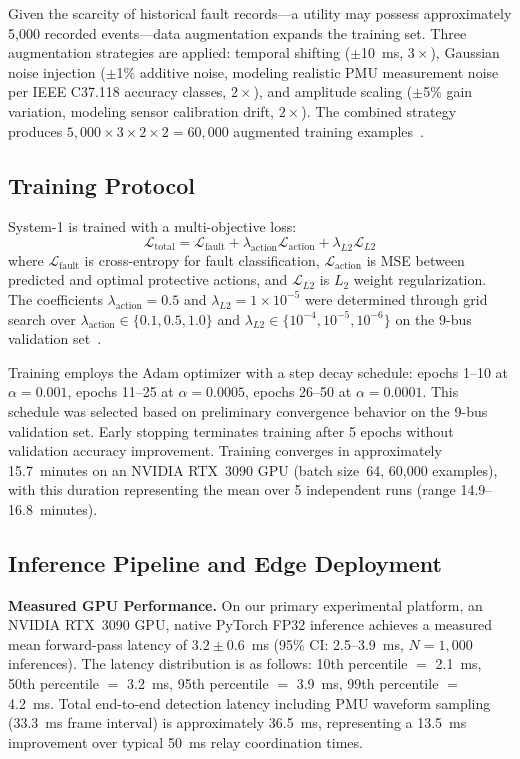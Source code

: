\documentclass[journal]{IEEEtran}
\begin{document}
Given the scarcity of historical fault records---a utility may possess approximately 5,000 recorded events---data augmentation expands the training set. Three augmentation strategies are applied: temporal shifting ($\pm$10~ms, $3\times$), Gaussian noise injection ($\pm$1\% additive noise, modeling realistic PMU measurement noise per IEEE C37.118 accuracy classes, $2\times$), and amplitude scaling ($\pm$5\% gain variation, modeling sensor calibration drift, $2\times$). The combined strategy produces $5,000 \times 3 \times 2 \times 2 = 60,000$ augmented training examples~\cite{ref27}.

\subsection{Training Protocol}

System-1 is trained with a multi-objective loss:
\begin{equation}
\mathcal{L}_{\text{total}} = \mathcal{L}_{\text{fault}} + \lambda_{\text{action}} \mathcal{L}_{\text{action}} + \lambda_{L2} \mathcal{L}_{L2}
\end{equation}
where $\mathcal{L}_{\text{fault}}$ is cross-entropy for fault classification, $\mathcal{L}_{\text{action}}$ is MSE between predicted and optimal protective actions, and $\mathcal{L}_{L2}$ is $L_2$ weight regularization. The coefficients $\lambda_{\text{action}} = 0.5$ and $\lambda_{L2} = 1\!\times\!10^{-5}$ were determined through grid search over $\lambda_{\text{action}} \in \{0.1, 0.5, 1.0\}$ and $\lambda_{L2} \in \{10^{-4}, 10^{-5}, 10^{-6}\}$ on the 9-bus validation set~\cite{ref28}.

Training employs the Adam optimizer with a step decay schedule: epochs 1--10 at $\alpha = 0.001$, epochs 11--25 at $\alpha = 0.0005$, epochs 26--50 at $\alpha = 0.0001$. This schedule was selected based on preliminary convergence behavior on the 9-bus validation set. Early stopping terminates training after 5 epochs without validation accuracy improvement. Training converges in approximately 15.7~minutes on an NVIDIA RTX~3090 GPU (batch size~64, 60,000 examples), with this duration representing the mean over 5 independent runs (range 14.9--16.8~minutes).

\subsection{Inference Pipeline and Edge Deployment}

\textbf{Measured GPU Performance.} On our primary experimental platform, an NVIDIA RTX~3090 GPU, native PyTorch FP32 inference achieves a measured mean forward-pass latency of $3.2 \pm 0.6$~ms (95\% CI: 2.5--3.9~ms, $N = 1,000$ inferences). The latency distribution is as follows: 10th percentile $=$ 2.1~ms, 50th percentile $=$ 3.2~ms, 95th percentile $=$ 3.9~ms, 99th percentile $=$ 4.2~ms. Total end-to-end detection latency including PMU waveform sampling (33.3~ms frame interval) is approximately 36.5~ms, representing a 13.5~ms improvement over typical 50~ms relay coordination times.
\end{document}
